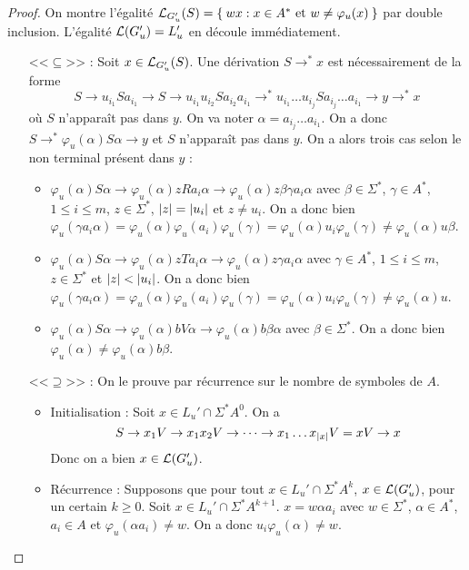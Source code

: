 \documentclass[11pt,a4paper]{article}
\theoremstyle{plain}
\theoremstyle{definition}
\theoremstyle{definition}
\theoremstyle{remark}
\theoremstyle{remark}
\theoremstyle{plain}
\theoremstyle{plain}
\theoremstyle{plain}
\theoremstyle{remark}
\begin{document}
\begin{proof}
	On montre l'égalité $\mathcal{L}_{G_u'}(S) = \Set{wx : x \in A^*\text{ et } w\not=\varphi_u(x)}$ par double inclusion. L'égalité $\mathcal{L}(G_u')= L_u'$ en découle immédiatement.
	\begin{itemize}
		\item[<<$\subseteq$>>] : Soit $x\in \mathcal{L}_{G_u'}(S)$. Une dérivation $S\to^* x$ est nécessairement de la forme $$\displaystyle S\to u_{i_1}Sa_{i_1}\to S\to u_{i_1}u_{i_2}Sa_{i_2}a_{i_1}\to^* u_{i_1}\dots u_{i_j}Sa_{i_j}\dots a_{i_1}\to y \to^* x$$ où $S$ n’apparaît pas dans $y$. On va noter $\alpha=a_{i_j}\dots a_{i_1}$. On a donc $S\to^*\varphi_u(\alpha)S\alpha\to y$ et $S$ n’apparaît pas dans $y$. On a alors trois cas selon le non terminal présent dans $y$ :
		\begin{itemize}
			\item $\varphi_u(\alpha)S\alpha\to \varphi_u(\alpha)zRa_i\alpha\to \varphi_u(\alpha)z\beta\gamma a_i\alpha$ avec $\beta\in \Sigma^*$, $\gamma\in A^*$, $1\le i \le m$, $z\in\Sigma^*$, $\left|z\right|=\left|u_i\right|$ et $z\not=u_i$. On a donc bien $\varphi_u(\gamma a_i\alpha)=\varphi_u(\alpha)\varphi_u(a_i)\varphi_u(\gamma)=\varphi_u(\alpha)u_i\varphi_u(\gamma)\not=\varphi_u(\alpha)u\beta$.
			\item $\varphi_u(\alpha)S\alpha\to \varphi_u(\alpha)zTa_i\alpha\to \varphi_u(\alpha)z\gamma a_i\alpha$ avec $\gamma\in A^*$, $1\le i \le m$, $z\in\Sigma^*$ et $\left|z\right|<\left|u_i\right|$. On a donc bien $\varphi_u(\gamma a_i\alpha)=\varphi_u(\alpha)\varphi_u(a_i)\varphi_u(\gamma)=\varphi_u(\alpha)u_i\varphi_u(\gamma)\not=\varphi_u(\alpha)u$.
			\item $\varphi_u(\alpha)S\alpha\to \varphi_u(\alpha)bV\alpha\to \varphi_u(\alpha)b\beta \alpha$ avec $\beta\in \Sigma^*$. On a donc bien $\varphi_u(\alpha)\not=\varphi_u(\alpha)b\beta$.
		\end{itemize}
		\item[<<$\supseteq$>>] : On le prouve par récurrence sur le nombre de symboles de $A$.
		\begin{itemize}
			\item Initialisation : Soit $x\in L_u'\cap\Sigma^*A^0$. On a
			$$S\to x_1V \to x_1x_2V\to \dots \to x_1\dots x_{\left|x\right|}V=xV\to x$$
			Donc on a bien $x\in \mathcal{L}(G_u')$.
			\item Récurrence : Supposons que pour tout $x\in L_u'\cap\Sigma^*A^k$, $x\in \mathcal{L}(G_u')$, pour un certain $k\ge 0$. Soit $x \in L_u'\cap\Sigma^*A^{k+1}$. $x=w\alpha a_i$ avec $w\in\Sigma^*$, $\alpha\in A^*$, $a_i\in A$ et $\varphi_u(\alpha a_i)\not= w$. On a donc $u_i\varphi_u(\alpha)\not= w$.

\end{itemize}
\end{itemize}
\end{proof}
\end{document}
